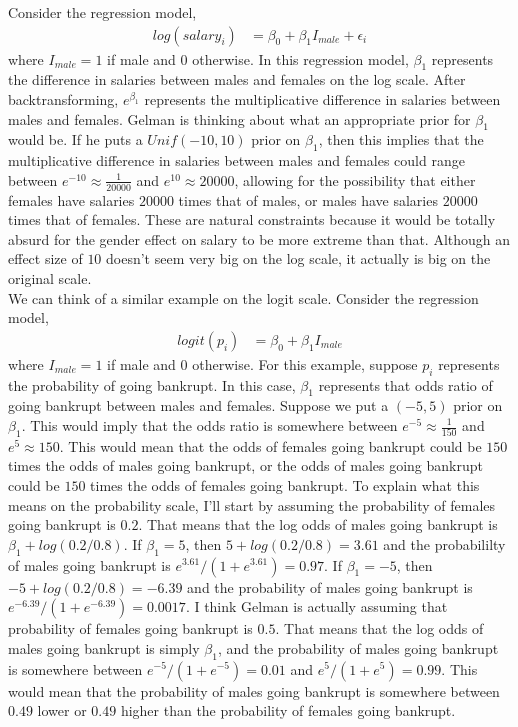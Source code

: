 \documentclass[12pt]{article}\usepackage[]{graphicx}\usepackage[]{color}
\begin{document}
\begin{doublespacing}
\noindent Consider the regression model,
\begin{align*}
log(salary_i) &= \beta_0+\beta_1I_{male}+\epsilon_i
\end{align*}
where $I_{male}=1$ if male and $0$ otherwise. In this regression model, $\beta_1$ represents the difference in salaries between males and females on the log scale. After backtransforming, $e^{\beta_1}$ represents the multiplicative difference in salaries between males and females. Gelman is thinking about what an appropriate prior for $\beta_1$ would be. If he puts a $Unif(-10, 10)$ prior on $\beta_1$, then this implies that the multiplicative difference in salaries between males and females could range between $e^{-10}\approx\frac{1}{20000}$ and $e^10\approx 20000$, allowing for the possibility that either females have salaries $20000$ times that of males, or males have salaries $20000$ times that of females. These are natural constraints because it would be totally absurd for the gender effect on salary to be more extreme than that. Although an effect size of $10$ doesn't seem very big on the log scale, it actually is big on the original scale. \\

\noindent We can think of a similar example on the logit scale. Consider the regression model,
\begin{align*}
logit(p_i) &= \beta_0+\beta_1I_{male}
\end{align*}
where $I_{male}=1$ if male and $0$ otherwise. For this example, suppose $p_i$ represents the probability of going bankrupt. In this case, $\beta_1$ represents that odds ratio of going bankrupt between males and females. Suppose we put a $(-5, 5)$ prior on $\beta_1$. This would imply that the odds ratio is somewhere between $e^{-5}\approx \frac{1}{150}$ and $e^{5}\approx 150$. This would mean that the odds of females going bankrupt could be $150$ times the odds of males going bankrupt, or the odds of males going bankrupt could be $150$ times the odds of females going bankrupt. To explain what this means on the probability scale, I'll start by assuming the probability of females going bankrupt is $0.2$. That means that the log odds of males going bankrupt is $\beta_1+log(0.2/0.8)$. If $\beta_1=5$, then $5+log(0.2/0.8)=3.61$ and the probabililty of males going bankrupt is $e^{3.61}/(1+e^{3.61})=0.97$. If $\beta_1=-5$, then $-5+log(0.2/0.8)=-6.39$ and the probability of males going bankrupt is $e^{-6.39}/(1+e^{-6.39})=0.0017$. I think Gelman is actually assuming that probability of females going bankrupt is $0.5$. That means that the log odds of males going bankrupt is simply $\beta_1$, and the probability of males going bankrupt is somewhere between $e^{-5}/(1+e^{-5})=0.01$ and $e^{5}/(1+e^{5})=0.99$. This would mean that the probability of males going bankrupt is somewhere between $0.49$ lower or $0.49$ higher than the probability of females going bankrupt. 


\end{doublespacing}
\end{document}

